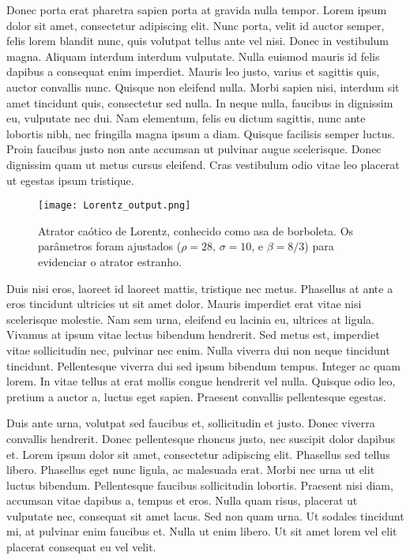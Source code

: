 Donec porta erat pharetra sapien porta at gravida nulla tempor. Lorem
ipsum dolor sit amet, consectetur adipiscing elit. Nunc porta, velit
id auctor semper, felis lorem blandit nunc, quis volutpat tellus ante
vel nisi. Donec in vestibulum magna. Aliquam interdum interdum
vulputate. Nulla euismod mauris id felis dapibus a consequat enim
imperdiet. Mauris leo justo, varius et sagittis quis, auctor convallis
nunc. Quisque non eleifend nulla. Morbi sapien nisi, interdum sit amet
tincidunt quis, consectetur sed nulla. In neque nulla, faucibus in
dignissim eu, vulputate nec dui. Nam elementum, felis eu dictum
sagittis, nunc ante lobortis nibh, nec fringilla magna ipsum a
diam. Quisque facilisis semper luctus. Proin faucibus justo non ante
accumsan ut pulvinar augue scelerisque. Donec dignissim quam ut metus
cursus eleifend. Cras vestibulum odio vitae leo placerat ut egestas
ipsum tristique.

\begin{figure}
  \caption{Atrator ca\'otico de Lorentz, conhecido como asa de
    borboleta. Os par\^ametros foram ajustados ($\rho = 28$, $\sigma =
    10$, e $\beta = 8/3$) para evidenciar o atrator estranho.}
  \texttt{[image: Lorentz\_output.png]}
  \fonte{}
\end{figure}

Duis nisi eros, laoreet id laoreet mattis, tristique nec
metus. Phasellus at ante a eros tincidunt ultricies ut sit amet
dolor. Mauris imperdiet erat vitae nisi scelerisque molestie. Nam sem
urna, eleifend eu lacinia eu, ultrices at ligula. Vivamus at ipsum
vitae lectus bibendum hendrerit. Sed metus est, imperdiet vitae
sollicitudin nec, pulvinar nec enim. Nulla viverra dui non neque
tincidunt tincidunt. Pellentesque viverra dui sed ipsum bibendum
tempus. Integer ac quam lorem. In vitae tellus at erat mollis congue
hendrerit vel nulla. Quisque odio leo, pretium a auctor a, luctus eget
sapien. Praesent convallis pellentesque egestas.

Duis ante urna, volutpat sed faucibus et, sollicitudin et justo. Donec
viverra convallis hendrerit. Donec pellentesque rhoncus justo, nec
suscipit dolor dapibus et. Lorem ipsum dolor sit amet, consectetur
adipiscing elit. Phasellus sed tellus libero. Phasellus eget nunc
ligula, ac malesuada erat. Morbi nec urna ut elit luctus
bibendum. Pellentesque faucibus sollicitudin lobortis. Praesent nisi
diam, accumsan vitae dapibus a, tempus et eros. Nulla quam risus,
placerat ut vulputate nec, consequat sit amet lacus. Sed non quam
urna. Ut sodales tincidunt mi, at pulvinar enim faucibus et. Nulla ut
enim libero. Ut sit amet lorem vel elit placerat consequat eu vel
velit.

